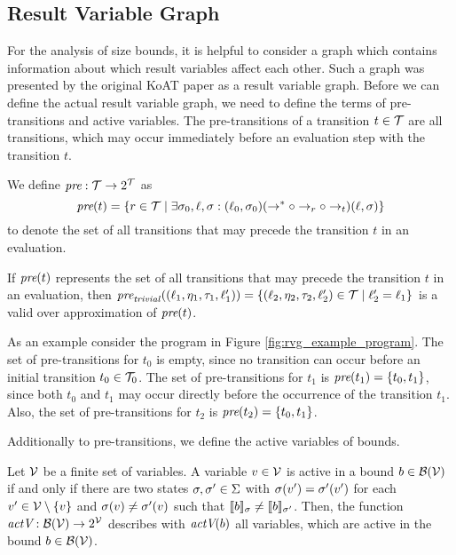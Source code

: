 \subsection{Result Variable Graph}

For the analysis of size bounds, it is helpful to consider a graph which contains information about which result variables affect each other.
Such a graph was presented by the original KoAT paper \cite{koat} as a result variable graph.
Before we can define the actual result variable graph, we need to define the terms of pre-transitions and active variables.
The pre-transitions of a transition $t \in \mathcal{T}$ are all transitions, which may occur immediately before an evaluation step with the transition $t$.

\begin{definition} 
  We define $\emph{pre}: \mathcal{T} \rightarrow 2^{\mathcal{T}}$ as
  \[\emph{pre}(t) = \lbrace r \in \mathcal{T} \mid \exists \sigma_0, \ell, \sigma: (\ell_0, \sigma_0) (\rightarrow^* \circ \rightarrow_r \circ \rightarrow_{t}) (\ell, \sigma) \rbrace\]
  to denote the set of all transitions that may precede the transition $t$ in an evaluation.	
\end{definition}

If $\emph{pre}(t)$ represents the set of all transitions that may precede the transition $t$ in an evaluation, then $\emph{pre}_{\mathit{trivial}}((\ell_1, \eta_1, \tau_1, \ell_1')) = \lbrace (\ell_2, \eta_2, \tau_2, \ell_2') \in \mathcal{T} \mid \ell_2' = \ell_1 \rbrace$ is a valid over approximation of $\emph{pre}(t)$.



As an example consider the program in Figure \ref{fig:rvg_example_program}.
The set of pre-transitions for $t_0$ is empty, since no transition can occur before an initial transition $t_0 \in \mathcal{T}_0$.
The set of pre-transitions for $t_1$ is $\emph{pre}(t_1) = \lbrace t_0, t_1 \rbrace$, since both $t_0$ and $t_1$ may occur directly before the occurrence of the transition $t_1$.
Also, the set of pre-transitions for $t_2$ is $\emph{pre}(t_2) = \lbrace t_0, t_1 \rbrace$.

Additionally to pre-transitions, we define the active variables of bounds. 

\begin{definition}
  Let $\mathcal{V}$ be a finite set of variables.  
  A variable $v \in \mathcal{V}$ is active in a bound $b \in \mathcal{B}(\mathcal{V})$ if and only if there are two states $\sigma, \sigma' \in \Sigma$ with $\sigma(v') = \sigma'(v')$ for each $v' \in \mathcal{V} \setminus \lbrace v \rbrace$ and $\sigma(v) \neq \sigma'(v)$ such that $\llbracket b \rrbracket_{\sigma} \neq \llbracket b \rrbracket_{\sigma'}$.
  Then, the function $\emph{actV}: \mathcal{B}(\mathcal{V}) \rightarrow 2^{\mathcal{V}}$ describes with $\emph{actV}(b)$ all variables, which are active in the bound $b \in \mathcal{B}(\mathcal{V})$.
\end{definition}

